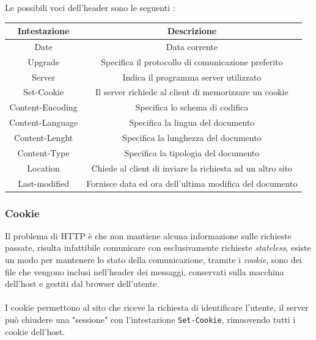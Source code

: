 \documentclass[12pt, letterpaper]{article}
\newcommand{\code}[1]{\colorbox{light-gray}{\texttt{#1}}}
\newcommand{\acc}{\\\hphantom{}\\}
\begin{document}
Le possibili voci dell'header sono le seguenti :\begin{center}
    \begin{tabular}{|c|c|}
        \hline
        \rowcolor[HTML]{C0C0C0} 
        \textbf{Intestazione} & \textbf{Descrizione}                                      \\ \hline
        \rowcolor[HTML]{FFFFFF} 
        Date                  & \cellcolor[HTML]{FFFFFF}Data corrente                     \\ \hline
        \rowcolor[HTML]{FFFFFF} 
        Upgrade               & Specifica il protocollo di comunicazione preferito        \\ \hline
        \rowcolor[HTML]{FFFFFF} 
        Server                & Indica il programma server utilizzato                     \\ \hline
        Set-Cookie            & Il server richiede al client di memorizzare un cookie     \\ \hline
        Content-Encoding      & Specifica lo schema di codifica                           \\ \hline
        Content-Language      & Specifica la lingua del documento                         \\ \hline
        \rowcolor[HTML]{FFFFFF} 
        Content-Lenght        & Specifica la lunghezza del documento                      \\ \hline
        \rowcolor[HTML]{FFFFFF} 
        Content-Type          & Specifica la tipologia del documento                      \\ \hline
        \rowcolor[HTML]{FFFFFF} 
        Location              & Chiede al client di inviare la richiesta ad un altro sito \\ \hline
        Last-modified         & Fornisce data ed ora dell'ultima modifica del documento   \\ \hline
        \end{tabular}
\end{center}
\subsubsection{Cookie}
Il problema di HTTP è che non mantiene alcuna informazione sulle richieste passate, risulta infattibile  
comunicare con esclusivamente richieste \textit{stateless}, esiste un modo per mantenere lo stato 
della comunicazione, tramite i \textit{cookie}, sono dei file che vengono inclusi nell'header dei messaggi, 
conservati sulla macchina dell'host e gestiti dal browser dell'utente.\acc I cookie permettono al sito che riceve 
la richiesta di identificare l'utente, il server può chiudere una "sessione" con l'intestazione 
\code{Set-Cookie}, rimuovendo tutti i cookie dell'host.
\end{document}
